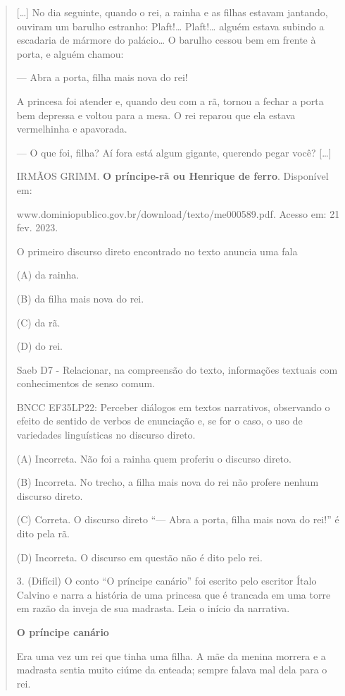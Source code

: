 \begin{quote}
{[}\ldots{}{]} No dia seguinte, quando o rei, a rainha e as filhas
estavam jantando, ouviram um barulho estranho: Plaft!\ldots{}
Plaft!\ldots{} alguém estava subindo a escadaria de mármore do
palácio\ldots{} O barulho cessou bem em frente à porta, e alguém chamou:

--- Abra a porta, filha mais nova do rei!

A princesa foi atender e, quando deu com a rã, tornou a fechar a porta
bem depressa e voltou para a mesa. O rei reparou que ela estava
vermelhinha e apavorada.

--- O que foi, filha? Aí fora está algum gigante, querendo pegar você?
{[}\ldots{}{]}

IRMÃOS GRIMM. \textbf{O príncipe-rã ou Henrique de ferro}. Disponível
em:

www.dominiopublico.gov.br/download/texto/me000589.pdf. Acesso em: 21
fev. 2023.

O primeiro discurso direto encontrado no texto anuncia uma fala

(A) da rainha.

(B) da filha mais nova do rei.

(C) da rã.

(D) do rei.

Saeb D7 - Relacionar, na compreensão do texto, informações textuais com
conhecimentos de senso comum.

BNCC EF35LP22: Perceber diálogos em textos narrativos, observando o
efeito de sentido de verbos de enunciação e, se for o caso, o uso de
variedades linguísticas no discurso direto.

(A) Incorreta. Não foi a rainha quem proferiu o discurso direto.

(B) Incorreta. No trecho, a filha mais nova do rei não profere nenhum
discurso direto.

(C) Correta. O discurso direto ``--- Abra a porta, filha mais nova do
rei!'' é dito pela rã.

(D) Incorreta. O discurso em questão não é dito pelo rei.

3. (Difícil) O conto ``O príncipe canário'' foi escrito pelo escritor
Ítalo Calvino e narra a história de uma princesa que é trancada em uma
torre em razão da inveja de sua madrasta. Leia o início da narrativa.

\textbf{O príncipe canário}

Era uma vez um rei que tinha uma filha. A mãe da menina morrera e a
madrasta sentia muito ciúme da enteada; sempre falava mal dela para o
rei.


\end{quote}
